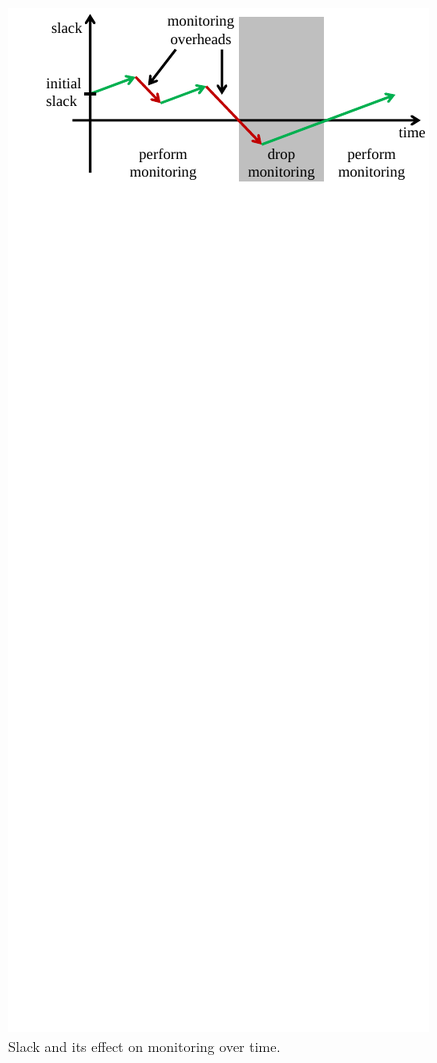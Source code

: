 \begin{figure}
  \begin{center}
    \includegraphics[width=\columnwidth]{figs/slack.pdf}
    \vspace{-0.3in}
    \caption{Slack and its effect on monitoring over time.}
    \label{fig:drop.slack}
    \vspace{-0.1in}
  \end{center}
\end{figure}

